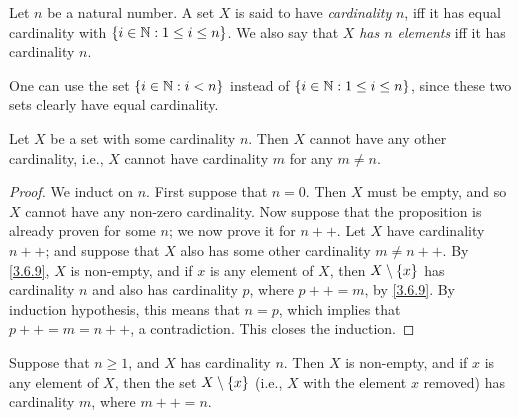 \begin{defn}\label{3.6.5}
  Let \(n\) be a natural number.
  A set \(X\) is said to have \emph{cardinality} \(n\), iff it has equal cardinality with \(\left\lbrace i \in \mathbb{N} : 1 \leq i \leq n\right\rbrace\).
  We also say that \(X\) \emph{has \(n\) elements} iff it has cardinality \(n\).
\end{defn}

\begin{rmk}\label{3.6.6}
  One can use the set \(\left\lbrace i \in \mathbb{N} : i < n\right\rbrace\) instead of \(\left\lbrace i \in \mathbb{N} : 1 \leq i \leq n\right\rbrace\), since these two sets clearly have equal cardinality.
\end{rmk}

\setcounter{thm}{7}
\begin{prop}\label{3.6.8}
  Let \(X\) be a set with some cardinality \(n\).
  Then \(X\) cannot have any other cardinality, i.e., \(X\) cannot have cardinality \(m\) for any \(m \neq n\).
\end{prop}

\begin{proof}
  We induct on \(n\).
  First suppose that \(n = 0\).
  Then \(X\) must be empty, and so \(X\) cannot have any non-zero cardinality.
  Now suppose that the proposition is already proven for some \(n\);
  we now prove it for \(n++\).
  Let \(X\) have cardinality \(n++\);
  and suppose that \(X\) also has some other cardinality \(m \neq n++\).
  By \cref{3.6.9}, \(X\) is non-empty, and if \(x\) is any element of \(X\), then \(X \setminus \left\lbrace x\right\rbrace\) has cardinality \(n\) and also has cardinality \(p\), where \(p++ = m\), by \cref{3.6.9}.
  By induction hypothesis, this means that \(n = p\), which implies that \(p++ = m = n++\), a contradiction.
  This closes the induction.
\end{proof}

\begin{lem}\label{3.6.9}
  Suppose that \(n \geq 1\), and \(X\) has cardinality \(n\).
  Then \(X\) is non-empty, and if \(x\) is any element of \(X\), then the set \(X \setminus \left\lbrace x\right\rbrace\) (i.e., \(X\) with the element \(x\) removed) has cardinality \(m\), where \(m++ = n\).
\end{lem}

